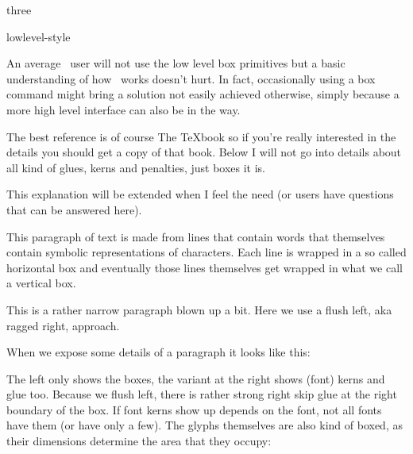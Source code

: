 three


\environment lowlevel-style

\startdocument
  [title=boxes,
   color=middlered]

\startsectionlevel[title=Introduction]

An average \CONTEXT\ user will not use the low level box primitives but a basic
understanding of how \TEX\ works doesn't hurt. In fact, occasionally using a box
command might bring a solution not easily achieved otherwise, simply because a
more high level interface can also be in the way.

The best reference is of course The \TeX book so if you're really interested in
the details you should get a copy of that book. Below I will not go into details
about all kind of glues, kerns and penalties, just boxes it is.

This explanation will be extended when I feel the need (or users have questions
that can be answered here).

\stopsectionlevel

\startsectionlevel[title=Boxes]

This paragraph of text is made from lines that contain words that themselves
contain symbolic representations of characters. Each line is wrapped in a so
called horizontal box and eventually those lines themselves get wrapped in what
we call a vertical box.

\startbuffer
\vbox \bgroup
    \hsize 5cm
    \raggedright
    This is a rather narrow paragraph blown up a bit. Here we use a flush left,
    aka ragged right, approach.
\egroup
\stopbuffer

When we expose some details of a paragraph it looks like this:

\startlinecorrection
\startcombination[2*1]
    {\scale[width=8cm]{\showmakeup[boxes]\getbuffer}} {}
    {\scale[width=8cm]{\showmakeup\getbuffer}}        {}
\stopcombination
\stoplinecorrection

The left only shows the boxes, the variant at the right shows (font) kerns and
glue too. Because we flush left, there is rather strong right skip glue at the
right boundary of the box. If font kerns show up depends on the font, not all
fonts have them (or have only a few). The glyphs themselves are also kind of
boxed, as their dimensions determine the area that they occupy:

\startlinecorrection
\stoplinecorrection

